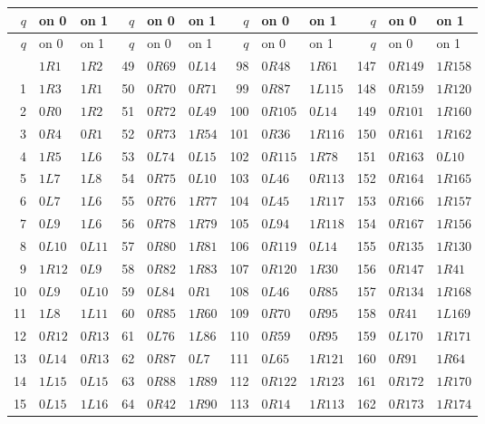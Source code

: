 \begingroup\fontsize{9}{10.5}\selectfont
\setlength{\tabcolsep}{3pt}
\begin{longtable}{@{}rll@{\quad}rll@{\quad}rll@{\quad}rll@{}}
\toprule $q$ & on 0 & on 1 & $q$ & on 0 & on 1 & $q$ & on 0 & on 1 & $q$ & on 0 & on 1 \\
\midrule\endfirsthead
\toprule $q$ & on 0 & on 1 & $q$ & on 0 & on 1 & $q$ & on 0 & on 1 & $q$ & on 0 & on 1 \\
\midrule\endhead
\bottomrule\endfoot
0 & $1R1$ & $1R2$ & 49 & $0R69$ & $0L14$ & 98 & $0R48$ & $1R61$ & 147 & $0R149$ & $1R158$ \\
1 & $1R3$ & $1R1$ & 50 & $0R70$ & $0R71$ & 99 & $0R87$ & $1L115$ & 148 & $0R159$ & $1R120$ \\
2 & $0R0$ & $1R2$ & 51 & $0R72$ & $0L49$ & 100 & $0R105$ & $0L14$ & 149 & $0R101$ & $1R160$ \\
3 & $0R4$ & $0R1$ & 52 & $0R73$ & $1R54$ & 101 & $0R36$ & $1R116$ & 150 & $0R161$ & $1R162$ \\
4 & $1R5$ & $1L6$ & 53 & $0L74$ & $0L15$ & 102 & $0R115$ & $1R78$ & 151 & $0R163$ & $0L10$ \\
5 & $1L7$ & $1L8$ & 54 & $0R75$ & $0L10$ & 103 & $0L46$ & $0R113$ & 152 & $0R164$ & $1R165$ \\
6 & $0L7$ & $1L6$ & 55 & $0R76$ & $1R77$ & 104 & $0L45$ & $1R117$ & 153 & $0R166$ & $1R157$ \\
7 & $0L9$ & $1L6$ & 56 & $0R78$ & $1R79$ & 105 & $0L94$ & $1R118$ & 154 & $0R167$ & $1R156$ \\
8 & $0L10$ & $0L11$ & 57 & $0R80$ & $1R81$ & 106 & $0R119$ & $0L14$ & 155 & $0R135$ & $1R130$ \\
9 & $1R12$ & $0L9$ & 58 & $0R82$ & $1R83$ & 107 & $0R120$ & $1R30$ & 156 & $0R147$ & $1R41$ \\
10 & $0L9$ & $0L10$ & 59 & $0L84$ & $0R1$ & 108 & $0L46$ & $0R85$ & 157 & $0R134$ & $1R168$ \\
11 & $1L8$ & $1L11$ & 60 & $0R85$ & $1R60$ & 109 & $0R70$ & $0R95$ & 158 & $0R41$ & $1L169$ \\
12 & $0R12$ & $0R13$ & 61 & $0L76$ & $1L86$ & 110 & $0R59$ & $0R95$ & 159 & $0L170$ & $1R171$ \\
13 & $0L14$ & $0R13$ & 62 & $0R87$ & $0L7$ & 111 & $0L65$ & $1R121$ & 160 & $0R91$ & $1R64$ \\
14 & $1L15$ & $0L15$ & 63 & $0R88$ & $1R89$ & 112 & $0R122$ & $1R123$ & 161 & $0R172$ & $1R170$ \\
15 & $0L15$ & $1L16$ & 64 & $0R42$ & $1R90$ & 113 & $0R14$ & $1R113$ & 162 & $0R173$ & $1R174$ \\

\end{longtable}
